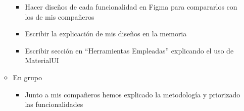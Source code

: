 \begin{itemize}
\begin{itemize}
\begin{itemize}
                        \item Hacer diseños de cada funcionalidad en Figma para compararlos con los de mis compañeros
                        \item Escribir la explicación de mis diseños en la memoria
                        \item Escribir sección en “Herramientas Empleadas” explicando el uso de MaterialUI
                    \end{itemize}
              \item En grupo
                    \begin{itemize}
                        \item Junto a mis compañeros hemos explicado la metodología y priorizado las funcionalidades
                    \end{itemize}
          \end{itemize}
\end{itemize}

